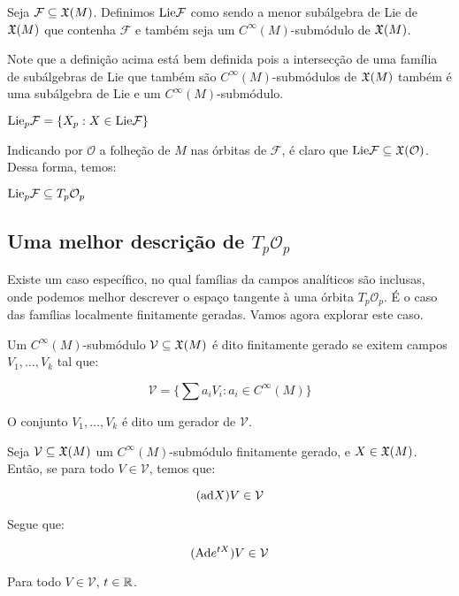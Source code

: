 \begin{definition}
    Seja $\mathcal{F} \subseteq \mathfrak{X}(M)$. Definimos
    $\text{Lie} \mathcal{F}$ como sendo a menor subálgebra de Lie
    de $\mathfrak{X}(M)$ que contenha $\mathcal{F}$ e também seja
    um $C^\infty(M)$-submódulo de $\mathfrak{X}(M)$.
\end{definition}

Note que a definição acima está bem definida pois a intersecção
de uma família de subálgebras de Lie que também são $C^\infty(M)$-submódulos
de $\mathfrak{X}(M)$ também é uma subálgebra de Lie e um $C^\infty(M)$-submódulo.

\begin{definition}
    $\text{Lie}_p \mathcal{F} = \{X_p : X \in \text{Lie}\mathcal{F}\} $
\end{definition}

Indicando por $\mathcal{O}$ a folheção de $M$ nas órbitas
de $\mathcal{F}$, é claro que $\text{Lie} \mathcal{F} \subseteq \mathfrak{X}(\mathcal{O})$.
Dessa forma, temos:

\begin{proposition}
    $\text{Lie}_p\mathcal{F} \subseteq T_p\mathcal{O}_p$
\end{proposition}

\subsection{Uma melhor descrição de $T_p \mathcal{O}_p$} Existe um caso específico,
no qual famílias da campos analíticos são inclusas, onde podemos melhor descrever
o espaço tangente à uma órbita $T_p\mathcal{O}_p$. É o
caso das famílias localmente finitamente geradas. Vamos agora explorar este caso.

\begin{definition}
    Um $C^\infty(M)$-submódulo $\mathcal{V}\subseteq \mathfrak{X}(M)$ é dito finitamente
    gerado se exitem campos $V_1,\dots,V_k$ tal que:

    $$\mathcal{V} = \{\sum a_i V_i : a_i \in C^\infty(M)\}$$

    O conjunto $V_1,\dots,V_k$ é dito um gerador de $\mathcal{V}$.
\end{definition}

\begin{proposition}
    Seja $\mathcal{V}\subseteq \mathfrak{X}(M)$ um $C^\infty(M)$-submódulo
    finitamente gerado, e $X \in \mathfrak{X}(M)$. Então,
    se para todo $V \in \mathcal{V}$, temos que:

    $$(\text{ad} X)V \in \mathcal{V}$$

    Segue que:

    $$(\text{Ad} e^{tX})V \in \mathcal{V}$$

    Para todo $V \in \mathcal{V}$, $t \in \mathbb{R}$.
\end{proposition}

